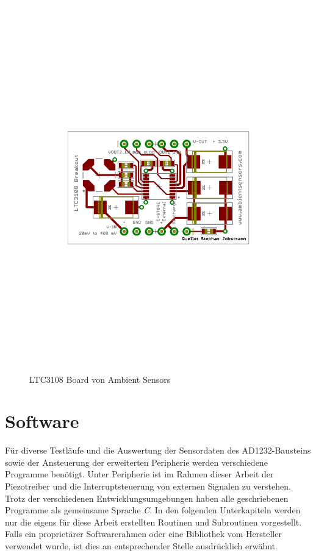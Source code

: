 \documentclass[12pt]{scrreprt} %
\begin{document}
\begin{figure}[htb]
\centering
\includegraphics[bb=3.4cm 10.6cm 17.5cm 19.4cm]{Bilder/LTC3108breakoutSSOC}
\caption{LTC3108 Board von Ambient Sensors}
\label{fig:4.1}
\end{figure}
\chapter{Software}
\label{Software}
Für diverse Testläufe und die Auswertung der Sensordaten des AD1232-Bausteins sowie der Ansteuerung der erweiterten Peripherie werden verschiedene Programme benötigt. Unter Peripherie ist im Rahmen dieser Arbeit der Piezotreiber und die Interruptsteuerung von externen Signalen zu verstehen. Trotz der verschiedenen Entwicklungsumgebungen haben alle geschriebenen Programme als gemeinsame Sprache \textit{C}. In den folgenden Unterkapiteln werden nur die eigens für diese Arbeit erstellten Routinen und Subroutinen vorgestellt. Falls ein proprietärer Softwarerahmen oder eine Bibliothek vom Hersteller verwendet wurde, ist dies an entsprechender Stelle ausdrücklich erwähnt.
\end{document}
